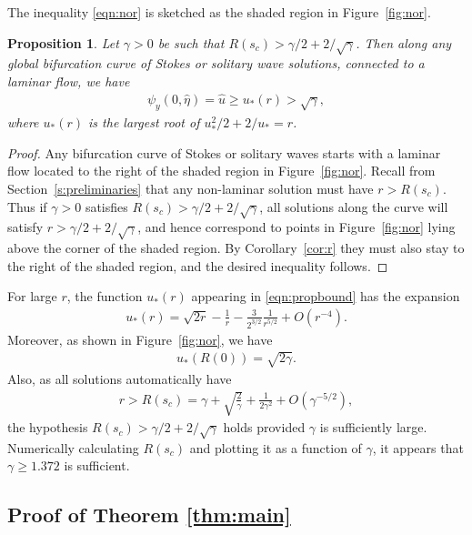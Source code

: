 \documentclass[pdflatex,sn-mathphys-num]{sn-jnl}%
\numberwithin{equation}{section}
\theoremstyle{thmstyleone}
\newtheorem{proposition}[theorem]{Proposition}
\newcommand{\ucrest}{\hat u} %
\begin{document}
The inequality \eqref{eqn:nor} is sketched as the shaded region in Figure~\ref{fig:nor}.

\begin{proposition}\label{prop:bound}
  Let $\gamma > 0$ be such that $R(s_c) > \gamma/2+2/\sqrt{\gamma}$. Then along any global bifurcation curve of Stokes or solitary wave solutions, connected to a laminar flow, we have
  \begin{align}
    \label{eqn:propbound}
    \psi_y(0,\hat\eta) = \ucrest \ge u_*(r) > \sqrt\gamma,
  \end{align}
  where $u_*(r)$ is the largest root of $u_*^2/2 + 2/u_* = r$. 
\end{proposition}
\begin{proof}
  Any bifurcation curve of Stokes or solitary waves starts with a laminar flow
  located to the right of the shaded region in Figure~\ref{fig:nor}. Recall
  from Section~\ref{s:preliminaries} that any non-laminar solution must have $r >
  R(s_c)$. Thus if $\gamma > 0$ satisfies $R(s_c) > \gamma/2+2/\sqrt{\gamma}$,
  all solutions along the curve will satisfy $r > \gamma/2+2/\sqrt{\gamma}$,
  and hence correspond to points in Figure~\ref{fig:nor} lying above the corner
  of the shaded region. By Corollary~\ref{cor:r} they must also stay to
  the right of the shaded region, and the desired inequality follows.
\end{proof}


For large $r$, the function $u_*(r)$ appearing in \eqref{eqn:propbound} has the expansion
\begin{align}\label{uasymp}
  u_*(r) = \sqrt{2r} - \frac 1r - \frac 3{2^{3/2}} \frac 1{r^{5/2}} + O(r^{-4}).
\end{align}
Moreover, as shown in Figure~\ref{fig:nor}, we have
\begin{align*}
  u_*(R(0)) = \sqrt{2\gamma}.
\end{align*}
Also, as all solutions automatically have
\begin{align}\label{Rcasymp}
  r > R(s_c) = \gamma + \sqrt {\frac 2{\gamma}} + \frac{1}{2\gamma^2}+ O(\gamma^{-5/2}),
\end{align}
the hypothesis $R(s_c) > \gamma/2+2/\sqrt{\gamma}$ holds provided $\gamma$ is sufficiently large. Numerically calculating $R(s_c)$ and plotting it as a function of $\gamma$, it appears that $\gamma \ge 1.372$ is sufficient.

\subsection{Proof of Theorem \ref{thm:main}}
\end{document}
